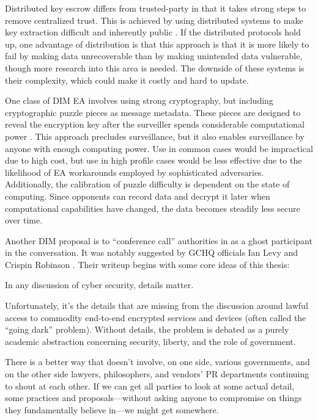 Distributed key escrow differs from trusted-party in that it takes strong steps to remove centralized trust. This is
achieved by using distributed systems to make key extraction difficult and inherently public \cite{phan_key_2017}
\cite{servan_schreiber_jje_2020}. If the distributed protocols hold up, one advantage of distribution is that this
approach is that it is more likely to fail by making data unrecoverable than by making unintended data vulnerable,
though more research into this area is needed. The downside of these systems is their complexity, which could make it
costly and hard to update.

One class of \ac{DIM} \ac{EA} involves using strong cryptography, but including cryptographic puzzle pieces as message
metadata. These pieces are designed to reveal the encryption key after the surveiller spends considerable computational
power \cite{bellare_translucent_1996} \cite{wright_crypto_2018}. This approach precludes  surveillance, but it
also enables  surveillance by anyone with enough computing power. Use in common cases would be impractical
due to high cost, but use in high profile cases would be less effective due to the likelihood of \ac{EA} workarounds
employed by sophisticated adversaries. Additionally, the calibration of puzzle difficulty is dependent on the state of
computing. Since opponents can record data and decrypt it later when computational capabilities have changed, the data
becomes steadily less secure over time.

Another \ac{DIM} proposal is to ``conference call'' authorities in as a ghost participant in the conversation. It was
notably suggested by \ac{GCHQ} officials Ian Levy and Crispin Robinson \cite{levy_robinson_2018}. Their writeup begins
with some core ideas of this thesis:

\begin{displayquote}
In any discussion of cyber security, details matter.

Unfortunately, it's the details that are missing from the discussion around lawful access to commodity end-to-end
encrypted services and devices (often called the ``going dark'' problem). Without details, the problem is debated as a
purely academic abstraction concerning security, liberty, and the role of government.

There is a better way that doesn’t involve, on one side, various governments, and on the other side lawyers,
philosophers, and vendors' PR departments continuing to shout at each other. If we can get all parties to look at some
actual detail, some practices and proposals---without asking anyone to compromise on things they fundamentally believe
in---we might get somewhere.
\cite{levy_robinson_2018}
\end{displayquote}

